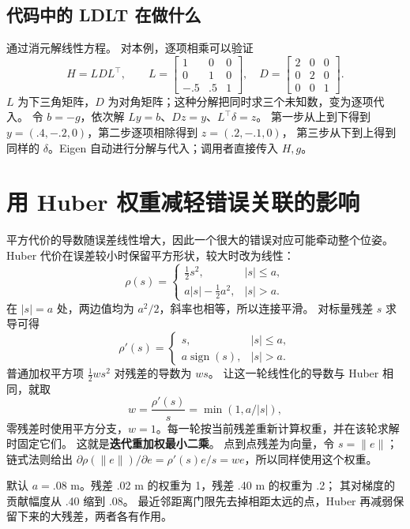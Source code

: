 \subsection{代码中的 LDLT 在做什么}
 通过消元解线性方程。
对本例，逐项相乘可以验证
\[
H=LDL^\top,\qquad
L=\begin{bmatrix}1&0&0\\0&1&0\\-.5&.5&1\end{bmatrix},\quad
D=\begin{bmatrix}2&0&0\\0&2&0\\0&0&1\end{bmatrix}.
\]
$L$ 为下三角矩阵，$D$ 为对角矩阵；这种分解把同时求三个未知数，变为逐项代入。
令 $b=-g$，依次解 $Ly=b$、$Dz=y$、$L^\top\delta=z$。
第一步从上到下得到 $y=(.4,-.2,0)$，第二步逐项相除得到 $z=(.2,-.1,0)$，
第三步从下到上得到同样的 $\delta$。Eigen 自动进行分解与代入；调用者直接传入 $H,g$。

\section{用 Huber 权重减轻错误关联的影响}
平方代价的导数随误差线性增大，因此一个很大的错误对应可能牵动整个位姿。
Huber 代价在误差较小时保留平方形状，较大时改为线性：
\begin{equation}
\rho(s)=
\begin{cases}\tfrac12s^2,&|s|\le a,\\a|s|-\tfrac12a^2,&|s|>a.\end{cases}
\end{equation}
在 $|s|=a$ 处，两边值均为 $a^2/2$，斜率也相等，所以连接平滑。
对标量残差 $s$ 求导可得
\[
\rho'(s)=\begin{cases}s,&|s|\le a,\\a\operatorname{sign}(s),&|s|>a.\end{cases}
\]
普通加权平方项 $\tfrac12ws^2$ 对残差的导数为 $ws$。
让这一轮线性化的导数与 Huber 相同，就取
\begin{equation}
w=\frac{\rho'(s)}s=\min(1,a/|s|),
\end{equation}
零残差时使用平方分支，$w=1$。每一轮按当前残差重新计算权重，并在该轮求解时固定它们。
这就是\textbf{迭代重加权最小二乘}。
点到点残差为向量，令 $s=\|e\|$；链式法则给出
$\partial\rho(\|e\|)/\partial e=\rho'(s)e/s=we$，所以同样使用这个权重。

默认 $a=.08$ m。残差 .02 m 的权重为 1，残差 .40 m 的权重为 .2；
其对梯度的贡献幅度从 .40 缩到 .08。
最近邻距离门限先去掉相距太远的点，Huber 再减弱保留下来的大残差，两者各有作用。

